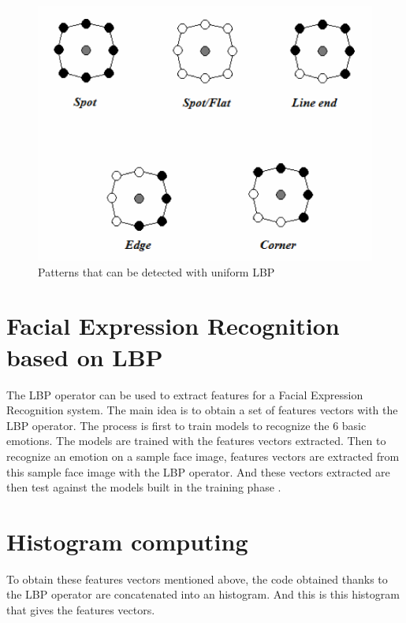 \begin{figure}[!h]
\begin{center}
\noindent \includegraphics[scale=0.6]{figures/lbp_structural_features} 
\newline
\caption{Patterns that can be detected with uniform LBP}
\label{lbp_structural_features}
\end{center} 
\end{figure}

\section{Facial Expression Recognition based on LBP}

\vspace{\baselineskip}
\noindent The LBP operator can be used to extract features for a Facial Expression Recognition system. The main idea is to obtain a set of features vectors with the LBP operator. The process is first to train models to recognize the 6 basic emotions. The models are trained with the features vectors extracted. Then to recognize an emotion on a sample face image, features vectors are extracted from this sample face image with the LBP operator. And these vectors extracted are then test against the models built in the training phase \cite{GAN08}.
\newline

\section{Histogram computing}

\vspace{\baselineskip}
\noindent To obtain these features vectors mentioned above, the code obtained thanks to the LBP operator are concatenated into an histogram. And this is this histogram that gives the features vectors.
\newline

